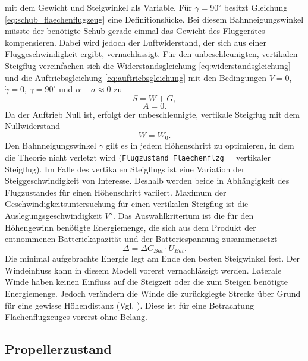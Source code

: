 mit dem Gewicht und Steigwinkel als Variable.
Für \ensuremath{\gamma = 90^\circ} besitzt Gleichung \ref{eq:schub_flaechenflugzeug} eine Definitionslücke. Bei diesem Bahnneigungswinkel müsste der benötigte Schub gerade einmal das Gewicht des Fluggerätes kompensieren. Dabei wird jedoch der Luftwiderstand, der sich aus einer Fluggeschwindigkeit ergibt, vernachlässigt. 
Für den unbeschleunigten, vertikalen Steigflug vereinfachen sich die Widerstandsgleichung \ref{eq:widerstandsgleichung} und die Auftriebsgleichung \ref{eq:auftriebsgleichung} mit den Bedingungen \ensuremath{\dot{V} = 0}, \ensuremath{\dot{\gamma} = 0}, \ensuremath{\gamma = 90^\circ} und \ensuremath{\alpha + \sigma \approx 0} zu 
\begin{equation}
	S = W + G , 
\end{equation}
\begin{equation}
	A = 0 .
\end{equation}
Da der Auftrieb Null ist, erfolgt der unbeschleunigte, vertikale Steigflug mit dem Nullwiderstand
\begin{equation}
	W = W_0 .
\end{equation}
Den Bahnneigungswinkel \ensuremath{\gamma} gilt es in jedem Höhenschritt zu optimieren, in dem die Theorie nicht verletzt wird (\texttt{Flugzustand\_Flaechenflzg} = vertikaler Steigflug). Im Falle des vertikalen Steigflugs ist eine Variation der Steiggeschwindigkeit von Interesse. Deshalb werden beide in Abhängigkeit des Flugzustandes für einen Höhenschritt variiert. Maximum der Geschwindigkeitsuntersuchung für einen vertikalen Steigflug ist die Auslegungsgeschwindigkeit \ensuremath{V^\star}. Das Auswahlkriterium ist die für den Höhengewinn benötigte Energiemenge, die sich aus dem Produkt der entnommenen Batteriekapazität und der Batteriespannung zusammensetzt
\begin{equation}
	\Delta = \Delta C_{Bat}\cdot U_{Bat}.
\end{equation}
Die minimal aufgebrachte Energie legt am Ende den besten Steigwinkel fest.
Der Windeinfluss kann in diesem Modell vorerst vernachlässigt werden. Laterale Winde haben keinen Einfluss auf die Steigzeit oder die zum Steigen benötigte Energiemenge. Jedoch verändern die Winde die zurückglegte Strecke über Grund für eine gewisse Höhendistanz (Vgl. \cite[S.241-242]{Scheiderer.2008}). Diese ist für eine Betrachtung Flächenflugzeuges vorerst ohne Belang. 


\subsection{Propellerzustand}
\label{subsec:propellerzustand}

